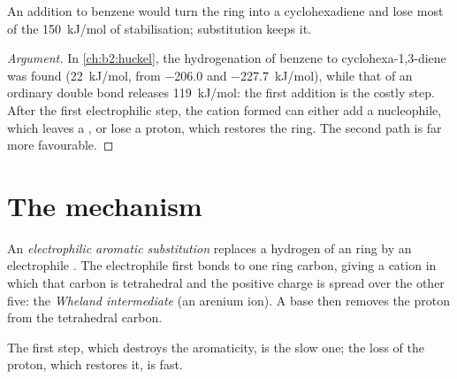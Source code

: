 \begin{proposition}\label{prop:b2:aromatic-substitution:no-addition}
An addition to benzene would turn the  ring into a  cyclohexadiene and
lose most of the \qty{150}{kJ/mol} of  stabilisation; substitution keeps it.
\end{proposition}

\begin{proof}[Argument]
In \cref{ch:b2:huckel}, the hydrogenation of benzene to cyclohexa-1,3-diene was found
 (\qty{+22}{kJ/mol}, from \qty{-206.0}{} and \qty{-227.7}{kJ/mol}), while that of an
ordinary double bond releases \qty{119}{kJ/mol}: the first addition is the costly step.
After the first electrophilic step, the cation formed can either add a nucleophile, which
leaves a  , or lose a proton, which restores the  ring. The second
path is far more favourable.
\end{proof}

\section{The mechanism}

\begin{definition}\label{def:b2:aromatic-substitution:seAr}
An \emph{electrophilic aromatic substitution}
replaces a hydrogen of an  ring by an electrophile . The electrophile first
bonds to one ring carbon, giving a cation in which that carbon is tetrahedral and the
positive charge is spread over the other five: the \emph{Wheland intermediate}
(an arenium ion). A base then removes the proton from the tetrahedral carbon.
\end{definition}

\begin{proposition}\label{prop:b2:aromatic-substitution:mechanism}
The first step, which destroys the aromaticity, is the slow one; the loss of the proton,
which restores it, is fast.
\end{proposition}

